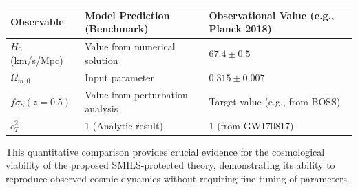 \documentclass[twocolumn]{aastex631}
\begin{document}
\begin{enumerate}
    \begin{center}
    \begin{tabular}{|l|l|l|}
    \hline
    \textbf{Observable} & \textbf{Model Prediction (Benchmark)} & \textbf{Observational Value (e.g., Planck 2018)} \\
    \hline
    $H_0$ (km/s/Mpc) & Value from numerical solution & $67.4 \pm 0.5$ \\
    $\Omega_{m,0}$ & Input parameter & $0.315 \pm 0.007$ \\
    $f\sigma_8(z=0.5)$ & Value from perturbation analysis & Target value (e.g., from BOSS) \\
    $c_T^2$ & 1 (Analytic result) & $1$ (from GW170817) \\
    \hline
    \end{tabular}
    \end{center}
    This quantitative comparison provides crucial evidence for the cosmological viability of the proposed SMILS-protected theory, demonstrating its ability to reproduce observed cosmic dynamics without requiring fine-tuning of parameters.
\end{enumerate}
\end{document}
